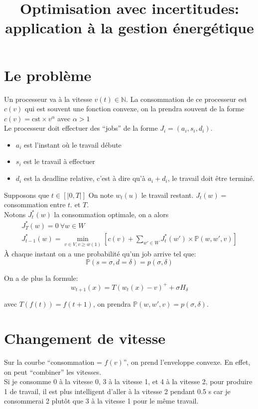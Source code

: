 \documentclass[10pt,a4paper]{article}
\title{Optimisation avec incertitudes: application à la gestion énergétique}
\begin{document}
\maketitle

\section{Le problème}
Un processeur va à la vitesse $v(t)\in \mathbb{N}$. La consommation de
ce processeur est $c(v)$ qui est souvent une fonction convexe, on la
prendra souvent de la forme $c(v)=\mbox{cst}\times v^\alpha$ avec
$\alpha>1$\\
Le processeur doit effectuer des ``jobs'' de la forme $J_i=(a_i, s_i,
d_i)$.
\begin{itemize}
\item $a_i$ est l'instant où le travail débute
\item $s_i$ est le travail à effectuer
\item $d_i$ est la deadline relative, c'est à dire qu'à $a_i+d_i$, le
  travail doit être terminé.
\end{itemize}
Supposons que $t\in [|0,T|]$
On note $w_t(u)$ le travail restant. $J_t(w)=$ consommation entre $t$.
et $T$.\\

Notons $J_t^*(w)$ la consommation optimale, on a alors\\

\begin{equation}
  \begin{array}{l}
    J_T^*(w)=0~\forall w\in W\\
    J_{t-1}^*(w)=\min\limits_{v\in V, v\geq w(1)}[c(v)+\sum_{w'\in
    W}J_t^*(w')\times\mathbb{P}(w,w',v)]
    
  \end{array}
\end{equation}
À chaque instant on a une probabilité qu'un job arrive tel que:
\begin{equation}
  \mathbb{P}(s=\sigma, d=\delta)=p(\sigma,\delta)  
\end{equation}

On a de plus la formule:
\begin{equation}
  w_{t+1}(x)=T(w_t(x)-v)^++\sigma H_{\delta}
\end{equation}

avec $T(f(t))=f(t+1)$, on prendra $\mathbb{P}(w, w', v)=p(\sigma,
\delta)$.


\section{Changement de vitesse}
Sur la courbe ``consommation = $f(v)$'', on prend l'enveloppe
convexe. En effet, on peut ``combiner'' les vitesses.\\
Si je consomme 0 à la vitesse 0, 3 à la vitesse 1, et 4 à la vitesse
2, pour produire 1 de travail, il est plus intelligent d'aller à la
vitesse 2 pendant 0.5 s car je consommerai 2 plutôt que 3 à la vitesse
1 pour le même travail.
\end{document}
